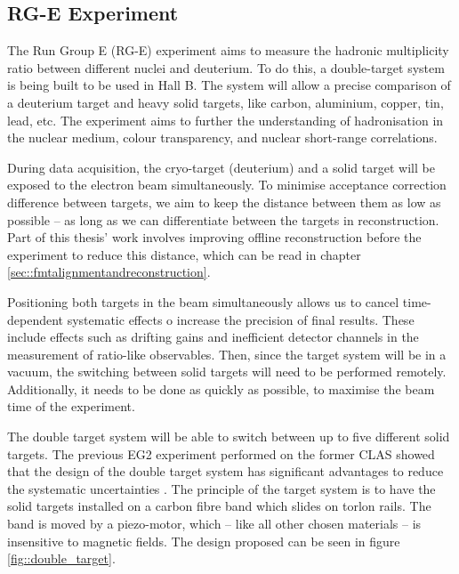 \subsection{RG-E Experiment} \label{ssec::rgeexperiment}
    The Run Group E (RG-E) experiment aims to measure the hadronic multiplicity ratio between different nuclei and deuterium.
    To do this, a double-target system is being built to be used in Hall B.
    The system will allow a precise comparison of a deuterium target and heavy solid targets, like carbon, aluminium, copper, tin, lead, etc.
    The experiment aims to further the understanding of hadronisation in the nuclear medium, colour transparency, and nuclear short-range correlations.

    During data acquisition, the cryo-target (deuterium) and a solid target will be exposed to the electron beam simultaneously.
    To minimise acceptance correction difference between targets, we aim to keep the distance between them as low as possible -- as long as we can differentiate between the targets in reconstruction.
    Part of this thesis' work involves improving offline reconstruction before the experiment to reduce this distance, which can be read in chapter \ref{sec::fmtalignmentandreconstruction}.

    Positioning both targets in the beam simultaneously allows us to cancel time-dependent systematic effects o increase the precision of final results.
    These include effects such as drifting gains and inefficient detector channels in the measurement of ratio-like observables.
    Then, since the target system will be in a vacuum, the switching between solid targets will need to be performed remotely.
    Additionally, it needs to be done as quickly as possible, to maximise the beam time of the experiment.

    The double target system will be able to switch between up to five different solid targets.
    The previous EG2 experiment performed on the former CLAS showed that the design of the double target system has significant advantages to reduce the systematic uncertainties \cite{hakobyan2008}.
    The principle of the target system is to have the solid targets installed on a carbon fibre band which slides on torlon rails.
    The band is moved by a piezo-motor, which -- like all other chosen materials -- is insensitive to magnetic fields.
    The design proposed can be seen in figure \ref{fig::double_target}.

